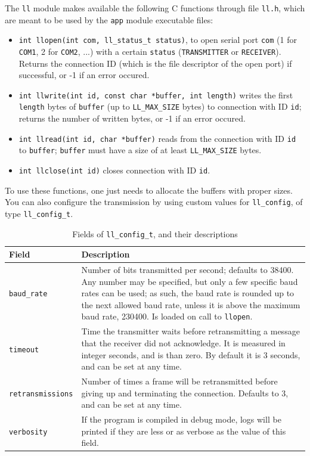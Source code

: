 \documentclass[a4paper, 11pt]{report}
\begin{document}
The \texttt{ll} module makes available the following C functions through file \texttt{ll.h}, which are meant to be used by the \texttt{app} module executable files:
\begin{itemize}
	\item \texttt{int llopen(int com, ll\_status\_t status)}, to open serial port \texttt{com} (1 for \texttt{COM1}, 2 for \texttt{COM2}, ...) with a certain \texttt{status} (\texttt{TRANSMITTER} or \texttt{RECEIVER}). Returns the connection ID (which is the file descriptor of the open port) if successful, or -1 if an error occured.
	\item \texttt{int llwrite(int id, const char *buffer, int length)} writes the first \texttt{length} bytes of \texttt{buffer} (up to \texttt{LL\_MAX\_SIZE} bytes) to connection with ID \texttt{id}; returns the number of written bytes, or -1 if an error occured.
	\item \texttt{int llread(int id, char *buffer)} reads from the connection with ID \texttt{id} to \texttt{buffer}; \texttt{buffer} must have a size of at least \texttt{LL\_MAX\_SIZE} bytes.
	\item \texttt{int llclose(int id)} closes connection with ID \texttt{id}.
\end{itemize}

To use these functions, one just needs to allocate the buffers with proper sizes. You can also configure the transmission by using custom values for \texttt{ll\_config}, of type \texttt{ll\_config\_t}.

\begin{table}[H]
	\centering
	\begin{tabular}{l | p{12cm}}
		\hline \hline
		\textbf{Field}           & \textbf{Description} \\ \hline
		\texttt{baud\_rate}      & Number of bits transmitted per second; defaults to 38400. Any number may be specified, but only a few specific baud rates can be used; as such, the baud rate is rounded up to the next allowed baud rate, unless it is above the maximum baud rate, 230400. Is loaded on call to \texttt{llopen}. \\ \hline
		\texttt{timeout}         & Time the transmitter waits before retransmitting a message that the receiver did not acknowledge. It is measured in integer seconds, and is than zero. By default it is 3 seconds, and can be set at any time. \\ \hline
		\texttt{retransmissions} & Number of times a frame will be retransmitted before giving up and terminating the connection. Defaults to 3, and can be set at any time. \\ \hline
		\texttt{verbosity}       & If the program is compiled in debug mode, logs will be printed if they are less or as verbose as the value of this field.\\ \hline \hline
	\end{tabular}
	\caption{Fields of \texttt{ll\_config\_t}, and their descriptions}
\end{table}
\end{document}

